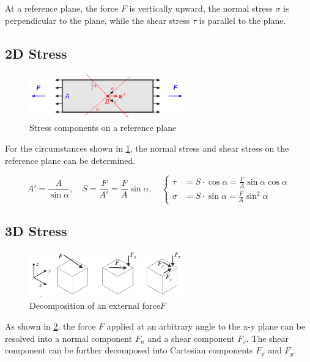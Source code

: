 \documentclass[en,hazy,cyan,8pt,normal]{elegantnote}
\numberwithin{equation}{section}
\begin{document}
    At a reference plane, the force $F$ is vertically upward, the normal stress $\sigma$ is perpendicular to the plane, while the shear stress $\tau$ is parallel to the plane.

  \subsection{2D Stress}
    \begin{figure}[H]
      \centering
      \includegraphics[width=0.6\textwidth]{image/001.png}
      \caption{Stress components on a reference plane}
      \label{fig:001}
    \end{figure}

    For the circumstances shown in \cref{fig:001}, the normal stress and shear stress on the reference plane can be determined.

    \begin{equation}\label{eq:002}
      A'=\frac{A}{\sin \alpha}, \quad S=\frac{F}{A'}=\frac{F}{A} \sin \alpha,\quad
      \left\{
      \begin{aligned}
        \tau&=S\cdot\cos\alpha=\frac{F}{A} \sin \alpha \cos \alpha\\
        \sigma&=S\cdot\sin\alpha=\frac{F}{A} \sin^2 \alpha
      \end{aligned}
      \right.
    \end{equation}

  \subsection{3D Stress}
    \begin{figure}[H]
      \centering
      \includegraphics[width=0.6\textwidth]{image/002.png}
      \caption{Decomposition of an external force$F$}
      \label{fig:002}
    \end{figure}

    As shown in \cref{fig:002}, the force $F$ applied at an arbitrary angle to the x-y plane can be resolved into a normal component $F_n$ and a shear component $F_s$. The shear component can be further decomposed into Cartesian components $F_x$ and $F_y$.
\end{document}
